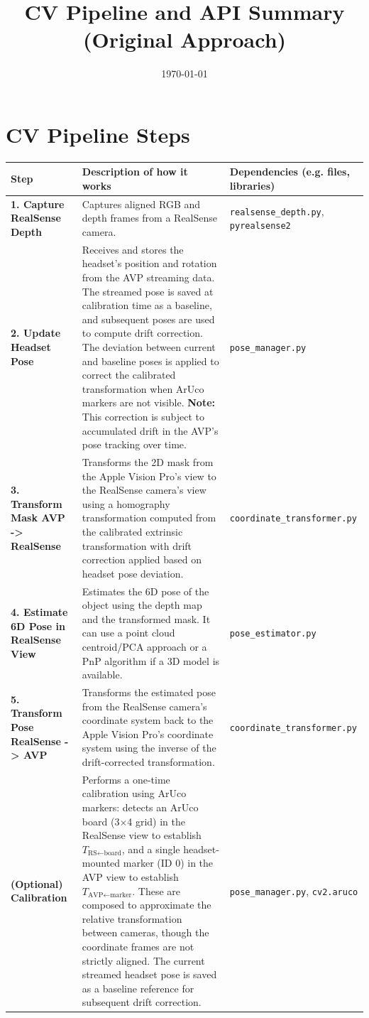 \documentclass{article}
\title{CV Pipeline and API Summary (Original Approach)}
\author{}
\date{\today}
\begin{document}
\maketitle

\section*{CV Pipeline Steps}

\begin{longtable}{| >{\raggedright\arraybackslash}p{} | >{\raggedright\arraybackslash}p{} | >{\raggedright\arraybackslash}p{} |}
\hline
\textbf{Step} & \textbf{Description of how it works} & \textbf{Dependencies (e.g. files, libraries)} \\
\hline
\endhead

\textbf{1. Capture RealSense Depth} & Captures aligned RGB and depth frames from a RealSense camera. & \texttt{realsense\_depth.py}, \texttt{pyrealsense2} \\
\hline
\textbf{2. Update Headset Pose} & Receives and stores the headset's position and rotation from the AVP streaming data. The streamed pose is saved at calibration time as a baseline, and subsequent poses are used to compute drift correction. The deviation between current and baseline poses is applied to correct the calibrated transformation when ArUco markers are not visible. \textbf{Note:} This correction is subject to accumulated drift in the AVP's pose tracking over time. & \texttt{pose\_manager.py} \\
\hline
\textbf{3. Transform Mask AVP -> RealSense} & Transforms the 2D mask from the Apple Vision Pro's view to the RealSense camera's view using a homography transformation computed from the calibrated extrinsic transformation with drift correction applied based on headset pose deviation. & \texttt{coordinate\_transformer.py} \\
\hline
\textbf{4. Estimate 6D Pose in RealSense View} & Estimates the 6D pose of the object using the depth map and the transformed mask. It can use a point cloud centroid/PCA approach or a PnP algorithm if a 3D model is available. & \texttt{pose\_estimator.py} \\
\hline
\textbf{5. Transform Pose RealSense -> AVP} & Transforms the estimated pose from the RealSense camera's coordinate system back to the Apple Vision Pro's coordinate system using the inverse of the drift-corrected transformation. & \texttt{coordinate\_transformer.py} \\
\hline
\textbf{(Optional) Calibration} & Performs a one-time calibration using ArUco markers: detects an ArUco board (3$\times$4 grid) in the RealSense view to establish $T_{\text{RS} \leftarrow \text{board}}$, and a single headset-mounted marker (ID 0) in the AVP view to establish $T_{\text{AVP} \leftarrow \text{marker}}$. These are composed to approximate the relative transformation between cameras, though the coordinate frames are not strictly aligned. The current streamed headset pose is saved as a baseline reference for subsequent drift correction. & \texttt{pose\_manager.py}, \texttt{cv2.aruco} \\
\hline
\end{longtable}
\end{document}
